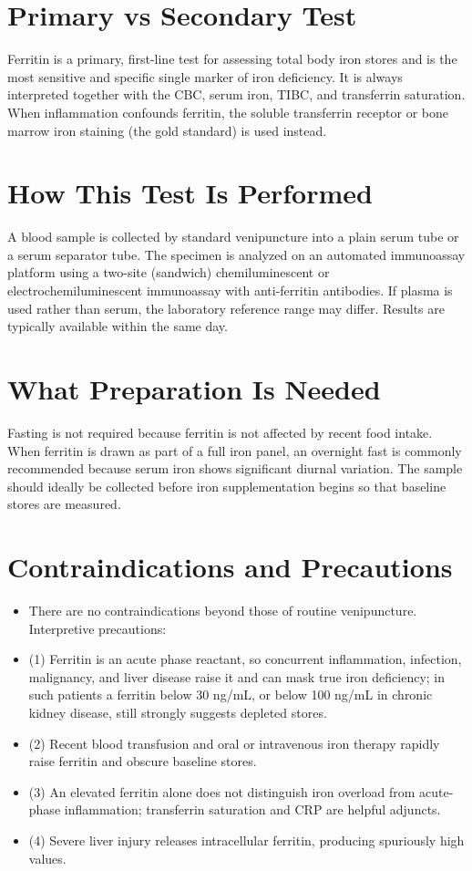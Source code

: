 \section*{Primary vs Secondary Test}
Ferritin is a primary, first-line test for assessing total body iron stores and is the most sensitive and specific single marker of iron deficiency. It is always interpreted together with the CBC, serum iron, TIBC, and transferrin saturation. When inflammation confounds ferritin, the soluble transferrin receptor or bone marrow iron staining (the gold standard) is used instead.
\section*{How This Test Is Performed}
A blood sample is collected by standard venipuncture into a plain serum tube or a serum separator tube. The specimen is analyzed on an automated immunoassay platform using a two-site (sandwich) chemiluminescent or electrochemiluminescent immunoassay with anti-ferritin antibodies. If plasma is used rather than serum, the laboratory reference range may differ. Results are typically available within the same day.
\section*{What Preparation Is Needed}
Fasting is not required because ferritin is not affected by recent food intake. When ferritin is drawn as part of a full iron panel, an overnight fast is commonly recommended because serum iron shows significant diurnal variation. The sample should ideally be collected before iron supplementation begins so that baseline stores are measured.
\section*{Contraindications and Precautions}
\begin{itemize}
  \item There are no contraindications beyond those of routine venipuncture. Interpretive precautions:
  \item (1) Ferritin is an acute phase reactant, so concurrent inflammation, infection, malignancy, and liver disease raise it and can mask true iron deficiency; in such patients a ferritin below 30 ng/mL, or below 100 ng/mL in chronic kidney disease, still strongly suggests depleted stores.
  \item (2) Recent blood transfusion and oral or intravenous iron therapy rapidly raise ferritin and obscure baseline stores.
  \item (3) An elevated ferritin alone does not distinguish iron overload from acute-phase inflammation; transferrin saturation and CRP are helpful adjuncts.
  \item (4) Severe liver injury releases intracellular ferritin, producing spuriously high values.
\end{itemize}

